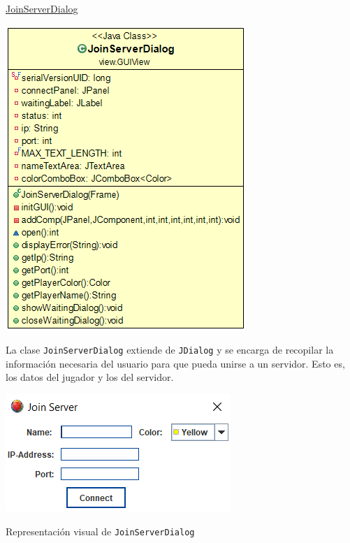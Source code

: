 \documentclass[12pt,a4paper,openright]{book}
\theoremstyle{break}
\begin{document}
\newpage

\underline{JoinServerDialog}

\begin{center}
\includegraphics[scale=0.6]{join-server-uml.png}
\end{center}

La clase \texttt{JoinServerDialog} extiende de \texttt{JDialog} y se encarga de recopilar la información necesaria del usuario para que pueda unirse a un servidor. Esto es, los datos del jugador y los del servidor.

\begin{center}
\includegraphics[scale=1]{join-server-sprint-6.png}

Representación visual de \texttt{JoinServerDialog}

\end{center}

\newpage
\end{document}
